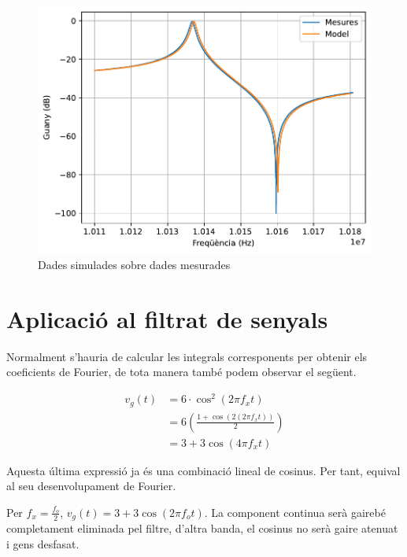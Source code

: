 \documentclass[catalan, a4paper, nobib]{tufte-handout}
\begin{document}
\begin{figure}
  \begin{center}
    \includegraphics[width=\linewidth]{comparacio.pdf}
  \end{center}
  \caption{Dades simulades sobre dades mesurades}
  \label{fig:comparation}
\end{figure}

\section{Aplicació al filtrat de senyals}

 Normalment s'hauria de calcular les integrals corresponents per obtenir els coeficients de Fourier, de tota manera també podem observar el següent.

\begin{align*}
  v_g(t) &= 6 \cdot \cos^2(2\pi f_x t) \\
  &= 6 \left ( \frac{1 + \cos \left ( 2 (2\pi f_x t) \right )}{2} \right ) \\
  &= 3 + 3\cos(4\pi f_x t)
\end{align*}

\newthought{} Aquesta última expressió ja és una combinació lineal de cosinus. Per tant, equival al seu desenvolupament de Fourier.

 Per $f_x = \frac{f_o}{2}$, $v_g(t) = 3+3\cos(2\pi f_o t)$. La component continua serà gairebé completament eliminada pel filtre, d'altra banda, el cosinus no serà gaire atenuat i gens desfasat.
\end{document}
